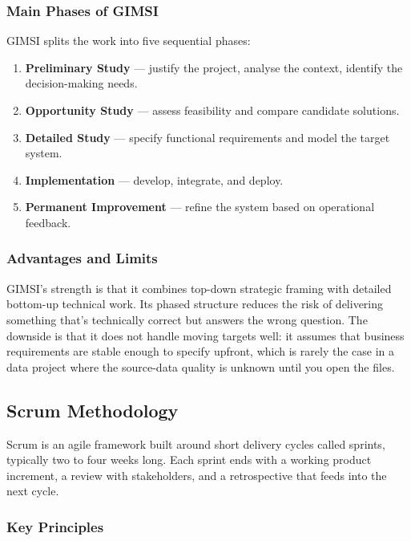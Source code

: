 \documentclass[12pt, a4paper]{report}
\begin{document}
\subsubsection{Main Phases of GIMSI}

GIMSI splits the work into five sequential phases:

\begin{enumerate}[noitemsep]
  \item \textbf{Preliminary Study} — justify the project, analyse the context,
        identify the decision-making needs.
  \item \textbf{Opportunity Study} — assess feasibility and compare candidate
        solutions.
  \item \textbf{Detailed Study} — specify functional requirements and model the
        target system.
  \item \textbf{Implementation} — develop, integrate, and deploy.
  \item \textbf{Permanent Improvement} — refine the system based on operational
        feedback.
\end{enumerate}

\subsubsection{Advantages and Limits}

GIMSI's strength is that it combines top-down strategic framing with detailed
bottom-up technical work. Its phased structure reduces the risk of delivering
something that's technically correct but answers the wrong question. The
downside is that it does not handle moving targets well: it assumes that
business requirements are stable enough to specify upfront, which is rarely
the case in a data project where the source-data quality is unknown until
you open the files.

\subsection{Scrum Methodology}

Scrum is an agile framework built around short delivery cycles called sprints,
typically two to four weeks long. Each sprint ends with a working product
increment, a review with stakeholders, and a retrospective that feeds into
the next cycle.

\subsubsection{Key Principles}
\end{document}
